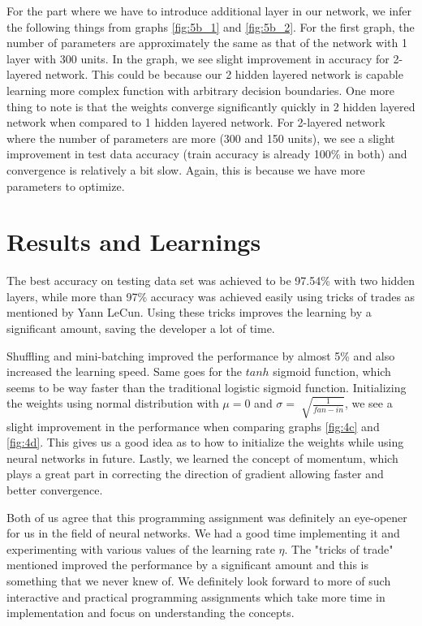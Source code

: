 \documentclass{article}
\begin{document}
For the part where we have to introduce additional layer in our network, we infer the following things from graphs \ref{fig:5b_1} and \ref{fig:5b_2}. For the first graph, the number of parameters are approximately the same as that of the network with 1 layer with 300 units. In the graph, we see slight improvement in accuracy for 2-layered network. This could be because our 2 hidden layered network is capable learning more complex function with arbitrary decision boundaries. One more thing to note is that the weights converge significantly quickly in 2 hidden layered network when compared to 1 hidden layered network. For 2-layered network where the number of parameters are more (300 and 150 units), we see a slight improvement in test data accuracy (train accuracy is already 100\% in both) and convergence is relatively a bit slow. Again, this is because we have more parameters to optimize.

\newpage
\section{Results and Learnings}
The best accuracy on testing data set was achieved to be 97.54\% with two hidden layers, while more than 97\% accuracy was achieved easily using tricks of trades as mentioned by Yann LeCun. Using these tricks improves the learning by a significant amount, saving the developer a lot of time. 

Shuffling and mini-batching improved the performance by almost 5\% and also increased the learning speed. Same goes for the $tanh$ sigmoid function, which seems to be way faster than the traditional logistic sigmoid function. Initializing the weights using normal distribution with $\mu=0$ and $\sigma = \sqrt[]{\frac{1}{fan-in}}$, we see a slight improvement in the performance when comparing graphs \ref{fig:4c} and \ref{fig:4d}. This gives us a good idea as to how to initialize the weights while using neural networks in future. Lastly, we learned the concept of momentum, which plays a great part in correcting the direction of gradient allowing faster and better convergence.

Both of us agree that this programming assignment was definitely an eye-opener for us in the field of neural networks. We had a good time implementing it and experimenting with various values of the learning rate $\eta$. The "tricks of trade" mentioned improved the performance by a significant amount and this is something that we never knew of. We definitely look forward to more of such interactive and practical programming assignments which take more time in implementation and focus on understanding the concepts.
\end{document}
